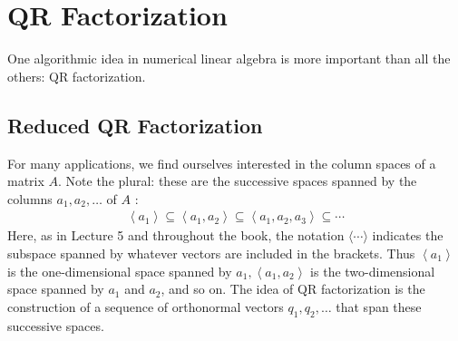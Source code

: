 \chapter{QR Factorization}
One algorithmic idea in numerical linear algebra is more important than all the others: QR factorization.

\section{Reduced QR Factorization}
For many applications, we find ourselves interested in the column spaces of a matrix $A$. Note the plural: these are the successive spaces spanned by the columns $a_1, a_2, \ldots$ of $A$ :
\begin{align*}
\left\langle a_1\right\rangle \subseteq\left\langle a_1, a_2\right\rangle \subseteq\left\langle a_1, a_2, a_3\right\rangle \subseteq \cdots
\end{align*}
Here, as in Lecture 5 and throughout the book, the notation $\langle\cdots\rangle$ indicates the subspace spanned by whatever vectors are included in the brackets. Thus $\left\langle a_1\right\rangle$ is the one-dimensional space spanned by $a_1,\left\langle a_1, a_2\right\rangle$ is the two-dimensional space spanned by $a_1$ and $a_2$, and so on. The idea of QR factorization is the construction of a sequence of orthonormal vectors $q_1, q_2, \ldots$ that span these successive spaces.

